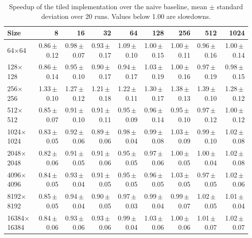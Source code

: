 \begin{table}[htbp]
\centering
\small
\caption{Speedup of the tiled implementation over the naive baseline, mean $\pm$ standard deviation over 20 runs. Values below 1.00 are slowdowns.}
\label{tab:tile-speedup}
\begin{tabular}{lrrrrrrrr}
\toprule
Size & 8 & 16 & 32 & 64 & 128 & 256 & 512 & 1024 \\
\midrule
64$\times$64 & 0.86\,$\pm$\,0.12 & 0.98\,$\pm$\,0.07 & 0.93\,$\pm$\,0.17 & 1.09\,$\pm$\,0.10 & 1.00\,$\pm$\,0.15 & 1.00\,$\pm$\,0.11 & 0.96\,$\pm$\,0.16 & 1.00\,$\pm$\,0.14 \\
128$\times$128 & 0.86\,$\pm$\,0.14 & 0.95\,$\pm$\,0.10 & 0.90\,$\pm$\,0.17 & 0.94\,$\pm$\,0.17 & 1.03\,$\pm$\,0.19 & 1.00\,$\pm$\,0.16 & 0.97\,$\pm$\,0.19 & 0.98\,$\pm$\,0.15 \\
256$\times$256 & 1.33\,$\pm$\,0.10 & 1.27\,$\pm$\,0.12 & 1.21\,$\pm$\,0.18 & 1.22\,$\pm$\,0.11 & 1.30\,$\pm$\,0.17 & 1.38\,$\pm$\,0.13 & 1.39\,$\pm$\,0.10 & 1.28\,$\pm$\,0.12 \\
512$\times$512 & 0.85\,$\pm$\,0.07 & 0.91\,$\pm$\,0.10 & 0.91\,$\pm$\,0.11 & 0.95\,$\pm$\,0.09 & 0.96\,$\pm$\,0.14 & 0.95\,$\pm$\,0.10 & 0.97\,$\pm$\,0.12 & 1.00\,$\pm$\,0.12 \\
1024$\times$1024 & 0.83\,$\pm$\,0.05 & 0.92\,$\pm$\,0.06 & 0.89\,$\pm$\,0.06 & 0.98\,$\pm$\,0.04 & 0.99\,$\pm$\,0.08 & 1.03\,$\pm$\,0.09 & 0.99\,$\pm$\,0.10 & 1.02\,$\pm$\,0.08 \\
2048$\times$2048 & 0.82\,$\pm$\,0.06 & 0.91\,$\pm$\,0.05 & 0.91\,$\pm$\,0.06 & 0.95\,$\pm$\,0.05 & 0.97\,$\pm$\,0.06 & 1.00\,$\pm$\,0.05 & 1.00\,$\pm$\,0.04 & 1.02\,$\pm$\,0.08 \\
4096$\times$4096 & 0.84\,$\pm$\,0.05 & 0.93\,$\pm$\,0.04 & 0.91\,$\pm$\,0.05 & 0.95\,$\pm$\,0.05 & 0.96\,$\pm$\,0.05 & 1.03\,$\pm$\,0.05 & 0.97\,$\pm$\,0.05 & 1.02\,$\pm$\,0.06 \\
8192$\times$8192 & 0.85\,$\pm$\,0.05 & 0.94\,$\pm$\,0.04 & 0.90\,$\pm$\,0.05 & 0.97\,$\pm$\,0.03 & 0.99\,$\pm$\,0.04 & 0.99\,$\pm$\,0.07 & 1.02\,$\pm$\,0.05 & 1.01\,$\pm$\,0.04 \\
16384$\times$16384 & 0.84\,$\pm$\,0.06 & 0.93\,$\pm$\,0.06 & 0.93\,$\pm$\,0.06 & 0.99\,$\pm$\,0.04 & 1.03\,$\pm$\,0.06 & 1.00\,$\pm$\,0.06 & 1.01\,$\pm$\,0.07 & 1.02\,$\pm$\,0.07 \\
\bottomrule
\end{tabular}
\end{table}
